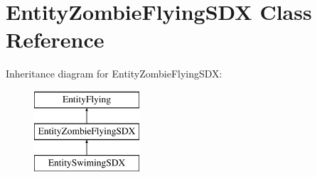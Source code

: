 \hypertarget{class_entity_zombie_flying_s_d_x}{}\section{Entity\+Zombie\+Flying\+S\+DX Class Reference}
\label{class_entity_zombie_flying_s_d_x}
Inheritance diagram for Entity\+Zombie\+Flying\+S\+DX\+:\begin{figure}[H]
\begin{center}
\leavevmode
\includegraphics[height=3.000000cm]{class_entity_zombie_flying_s_d_x}
\end{center}
\end{figure}

